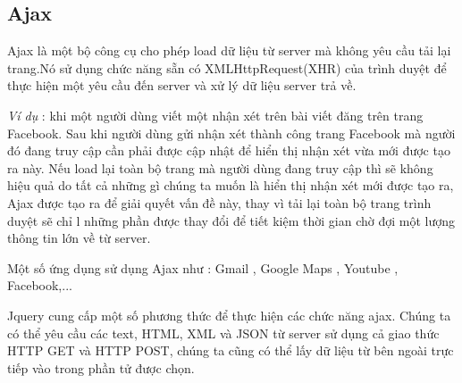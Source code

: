 \subsection{Ajax}
Ajax là một bộ công cụ cho phép load dữ liệu từ server mà không yêu cầu tải lại trang.Nó sử dụng chức năng sẵn có XMLHttpRequest(XHR) của trình duyệt để thực hiện một yêu cầu đến server và xử lý dữ liệu server trả về.
\par
\textit{Ví dụ} : khi một người dùng viết một nhận xét trên bài viết đăng trên trang Facebook. Sau khi người dùng gửi nhận xét thành công trang Facebook mà người đó đang truy cập cần phải được cập nhật để hiển thị nhận xét vừa mới được tạo ra này. Nếu load lại toàn bộ trang mà người dùng đang truy cập thì sẽ không hiệu quả do tất cả những gì chúng ta muốn là hiển thị nhận xét mới được tạo ra, Ajax được tạo ra để giải quyết vấn đề này, thay vì tải lại toàn bộ trang trình duyệt sẽ chỉ l những phần được thay đổi để tiết kiệm thời gian chờ đợi một lượng thông tin lớn về từ server.\par
Một số ứng dụng sử dụng Ajax như : Gmail , Google Maps , Youtube , Facebook,...\par
Jquery cung cấp một số phương thức để thực hiện các chức năng ajax. Chúng ta có thể yêu cầu các text, HTML, XML và JSON từ server sử dụng cả giao thức HTTP GET và HTTP POST, chúng ta cũng có thể lấy dữ liệu từ bên ngoài trực tiếp vào trong phần tử được chọn.
